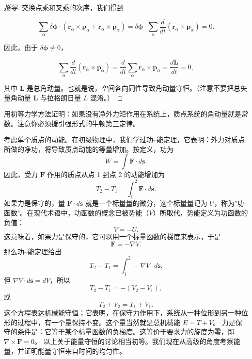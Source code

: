 \begin{proof}[推导]
交换点乘和叉乘的次序，我们得到

\[
\sum_{\alpha}\delta\boldsymbol{\phi}\cdot\left(\mathbf{r}_\alpha\times\dot{\mathbf{p}}_\alpha + \dot{\mathbf{r}}_\alpha\times\mathbf{p}_\alpha\right) = \delta\boldsymbol{\phi}\cdot\sum_{\alpha}\frac{d}{dt}\left(\mathbf{r}_\alpha\times\mathbf{p}_\alpha\right) = 0.
\]

因此，由于 $\delta\boldsymbol{\phi} \neq 0$，

\[
\sum_{\alpha}\frac{d}{dt}(\mathbf{r}_\alpha\times\mathbf{p}_\alpha) = \frac{d}{dt}\sum_{\alpha}\mathbf{r}_\alpha\times\mathbf{p}_\alpha = \frac{d\mathbf{L}}{dt} = 0,
\]

其中 $\mathbf{L}$ 是总角动量。也就是说，空间各向同性导致角动量守恒。（注意不要把总矢量角动量 $\mathbf{L}$ 与拉格朗日量 $L$ 混淆。）
\end{proof}
\begin{example}[例题 4.4（用初等力学证明角动量守恒）]
用初等力学方法证明：如果没有净外力矩作用在系统上，质点系统的角动量就是常数。注意你必须援引强形式的牛顿第三定律。
\end{example}
考虑单个质点的动能。在初级物理中，我们学过功--能定理，它表明：外力对质点所做的净功，将导致质点动能的等量增加。按定义，功为
\[
W = \int \mathbf{F}\cdot d\mathbf{s}.
\]
因此，受力 $\mathbf{F}$ 作用的质点从点 1 到点 2 的动能增加为
\[
T_2 - T_1 = \int_1^2 \mathbf{F}\cdot d\mathbf{s}.
\]
如果力是保守的，量 $\mathbf{F}\cdot d\mathbf{s}$ 就是一个标量量的微分，这个标量量记为 $U$，称为"功函数"。在现代术语中，功函数的概念已被势能（$V$）所取代，势能定义为功函数的负值：
\[
V = -U.
\]
这意味着，如果力是保守的，它可以用一个标量函数的梯度来表示，于是
\[
\mathbf{F} = -\nabla V.
\]
那么功--能定理给出
\[
T_2 - T_1 = \int_1^2 -\nabla V\cdot d\mathbf{s}.
\]
但 $\nabla V\cdot d\mathbf{s} = dV$，所以
\[
T_2 - T_1 = -(V_2 - V_1),
\]
或
\[
T_2 + V_2 = T_1 + V_1.
\]
这个方程表达机械能守恒；它表明，在保守力作用下，系统从一种位形到另一种位形的过程中，有一个量保持不变。这个量当然就是总机械能 $E = T + V$。
力是保守的条件是：它等于某个标量函数的负梯度。这等价于要求力的旋度为零，即 $\nabla\times\mathbf{F} = 0$。
以上关于能量守恒的讨论相当初等。我们现在从高级的角度考察能量，并证明能量守恒来自时间的均匀性。
